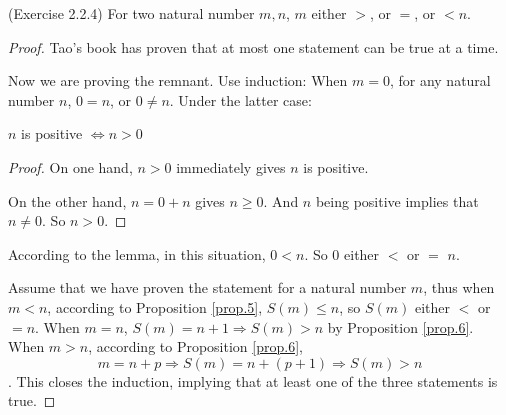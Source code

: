 \begin{prop}
(Exercise 2.2.4) \label{exercise2.2.4}
For two natural number $m,n$, $m$ either $>$, or $=$, or $<n$.
\end{prop}
\begin{proof}
Tao's book has proven that at most one statement can be true at a time.

Now we are proving the remnant. Use induction: When $m=0$, for any natural number $n$, 
$0=n$, or $0 \neq n$. Under the latter case:
\begin{lem}
$n$ is positive $\Leftrightarrow n>0$
\end{lem}
\begin{proof}
On one hand, $n>0$ immediately gives $n$ is positive.

On the other hand, $n=0+n$ gives $n \geq 0$. And $n$ being positive implies that $n \neq 0$. 
So $n > 0$.
\end{proof}

According to the lemma, in this situation, $0<n$. So 0 either $<$ or $=$ $n$.

Assume that we have proven the statement for a natural number $m$, thus when $m<n$, according to 
Proposition \ref{prop.5}, $S(m) \leq n$, so $S(m)$ either $<$ or $=n$. When $m=n$, 
$S(m)=n+1 \Rightarrow S(m) > n$ by Proposition \ref{prop.6}. When $m>n$, according to Proposition 
\ref{prop.6}, 
\[
m=n+p \Rightarrow S(m)=n+(p+1) \Rightarrow S(m)>n
\]. This closes the induction, implying that at least one of the three statements is true.
\end{proof}

